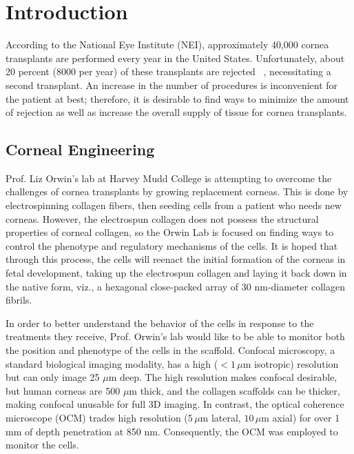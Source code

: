 
\def\mytitle{Chapter 2 -- DLS Studies and Protocol Optimization}

\def\bibliocommand{}
\chapter{Introduction}
\label{introduction}

According to the National Eye Institute (NEI), approximately 40,000 cornea transplants are performed every year in the United States. Unfortunately, about 20 percent (8000 per year) of these transplants are rejected ~\citep{NEI}, necessitating a second transplant. An increase in the number of procedures is inconvenient for the patient at best; therefore, it is desirable to find ways to minimize the amount of rejection as well as increase the overall supply of tissue for cornea transplants.

\section{Corneal Engineering}
\label{cornealengineering}

Prof. Liz Orwin's lab at Harvey Mudd College is attempting to overcome the challenges of cornea transplants by growing replacement corneas. This is done by electrospinning collagen fibers, then seeding cells from a patient who needs new corneas. However, the electrospun collagen does not possess the structural properties of corneal collagen, so the Orwin Lab is focused on finding ways to control the phenotype and regulatory mechanisms of the cells. It is hoped that through this process, the cells will reenact the initial formation of the corneas in fetal development, taking up the electrospun collagen and laying it back down in the native form, viz., a hexagonal close-packed array of 30 nm-diameter collagen fibrils.

In order to better understand the behavior of the cells in response to the treatments they receive, Prof. Orwin's lab would like to be able to monitor both the position and phenotype of the cells in the scaffold. Confocal microscopy, a standard biological imaging modality, has a high ($<1\,\mu$m isotropic) resolution but can only image 25 $\mu$m deep. The high resolution makes confocal desirable, but human corneas are 500 $\mu$m thick, and the collagen scaffolds can be thicker, making confocal unusable for full 3D imaging. In contrast, the optical coherence microscope (OCM) trades high resolution ($5\,\mu$m lateral, $10\,\mu$m axial) for over 1 mm of depth penetration at 850 nm. Consequently, the OCM was employed to monitor the cells.

